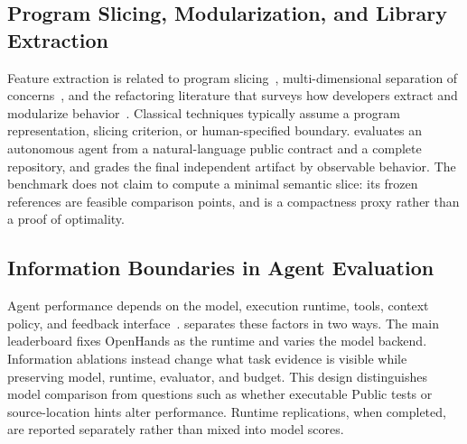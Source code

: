 \subsection{Program Slicing, Modularization, and Library Extraction}

Feature extraction is related to program slicing~\cite{weiser1984slicing},
multi-dimensional separation of concerns~\cite{tarr1999degrees}, and the
refactoring literature that surveys how developers extract and modularize
behavior~\cite{mens2004refactoring}. Classical techniques typically assume a
program representation, slicing criterion, or human-specified boundary. \flb
evaluates an autonomous agent from a natural-language public contract and a
complete repository, and grades the final independent artifact by observable
behavior. The benchmark does not claim to compute a minimal semantic slice: its
frozen references are feasible comparison points, and \rres is a compactness
proxy rather than a proof of optimality.

\subsection{Information Boundaries in Agent Evaluation}

Agent performance depends on the model, execution runtime, tools, context
policy, and feedback interface~\cite{yang2024sweagent,wang2024openhands,yao2026harnessbench}.
\flb separates these factors in two ways. The main leaderboard fixes OpenHands
as the \mainprotocol runtime and varies the model backend. Information
ablations instead change what task evidence is visible while preserving model,
runtime, evaluator, and budget. This design distinguishes model comparison from
questions such as whether executable Public tests or source-location hints
alter performance. Runtime replications, when completed, are reported
separately rather than mixed into model scores.

